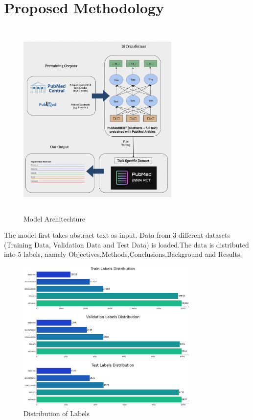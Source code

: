 \documentclass[conference]{IEEEtran}
\begin{document}
\section{Proposed Methodology}
\begin{figure}[h]
  \centering
  \includegraphics[width=8cm,height=10cm]{pubmed_architecture.png}
  \caption{Model Architechture}
  \label{fig:architectural}
\end{figure}
The model first takes abstract text as input. Data from 3 different datasets (Training Data, Validation Data and Test Data) is loaded.The data is distributed into 5 labels, namely Objectives,Methods,Conclusions,Background and Results.
\begin{figure}[h]
    \centering
    \includegraphics[width=9cm]{labels_distribution.png}
    \caption{Distribution of Labels}
    \label{fig: sequence diagram}
\end{figure}
\end{document}
